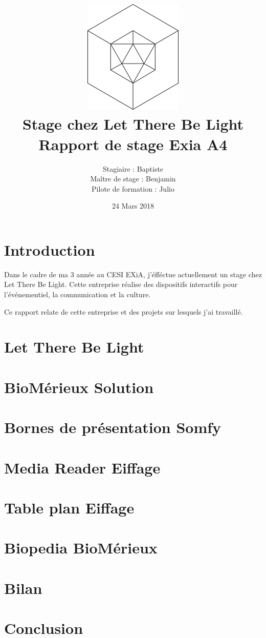 \documentclass{article}
\title{\includegraphics{img/logo.png}\vspace{2cm}\\
    Stage chez Let There Be Light \\
    \large Rapport de stage Exia A4}
\date{24 Mars 2018}
\author{Stagiaire : Baptiste \bsc{Saclier} \\
    Maître de stage : Benjamin \bsc{Petit}\\
    Pilote de formation : Julio \bsc{Santilario}}
\begin{document}
    \maketitle

    \clearpage

    \tableofcontents

    \section{Introduction}

    Dans le cadre de ma 3 année au CESI EXiA, j'éfféctue actuellement un stage chez Let There Be Light.
    Cette entreprise réalise des dispositifs interactifs pour l'événementiel, la communication et la culture.

    Ce rapport relate de cette entreprise et des projets sur lesquels j'ai travaillé.

    \clearpage

    \section{Let There Be Light}
    

    \section{BioMérieux Solution}
    

    

    \section{Bornes de présentation Somfy}

    \section{Media Reader Eiffage}

    \section{Table plan Eiffage}

    \section{Biopedia BioMérieux}

    \section{Bilan}

    \section{Conclusion}
\end{document}
